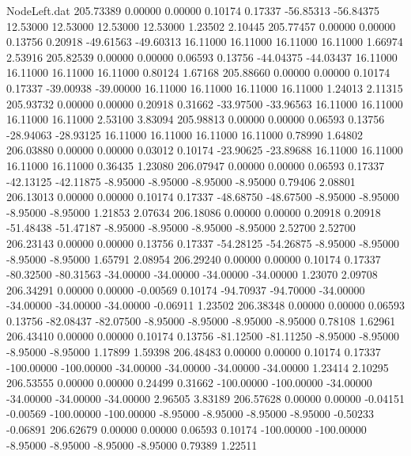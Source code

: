 \begin{filecontents}{NodeLeft.dat}
 205.73389    0.00000    0.00000     0.10174    0.17337  -56.85313  -56.84375   12.53000   12.53000   12.53000   12.53000    1.23502    2.10445
 205.77457    0.00000    0.00000     0.13756    0.20918  -49.61563  -49.60313   16.11000   16.11000   16.11000   16.11000    1.66974    2.53916
 205.82539    0.00000    0.00000     0.06593    0.13756  -44.04375  -44.03437   16.11000   16.11000   16.11000   16.11000    0.80124    1.67168
 205.88660    0.00000    0.00000     0.10174    0.17337  -39.00938  -39.00000   16.11000   16.11000   16.11000   16.11000    1.24013    2.11315
 205.93732    0.00000    0.00000     0.20918    0.31662  -33.97500  -33.96563   16.11000   16.11000   16.11000   16.11000    2.53100    3.83094
 205.98813    0.00000    0.00000     0.06593    0.13756  -28.94063  -28.93125   16.11000   16.11000   16.11000   16.11000    0.78990    1.64802
 206.03880    0.00000    0.00000     0.03012    0.10174  -23.90625  -23.89688   16.11000   16.11000   16.11000   16.11000    0.36435    1.23080
 206.07947    0.00000    0.00000     0.06593    0.17337  -42.13125  -42.11875   -8.95000   -8.95000   -8.95000   -8.95000    0.79406    2.08801
 206.13013    0.00000    0.00000     0.10174    0.17337  -48.68750  -48.67500   -8.95000   -8.95000   -8.95000   -8.95000    1.21853    2.07634
 206.18086    0.00000    0.00000     0.20918    0.20918  -51.48438  -51.47187   -8.95000   -8.95000   -8.95000   -8.95000    2.52700    2.52700
 206.23143    0.00000    0.00000     0.13756    0.17337  -54.28125  -54.26875   -8.95000   -8.95000   -8.95000   -8.95000    1.65791    2.08954
 206.29240    0.00000    0.00000     0.10174    0.17337  -80.32500  -80.31563  -34.00000  -34.00000  -34.00000  -34.00000    1.23070    2.09708
 206.34291    0.00000    0.00000    -0.00569    0.10174  -94.70937  -94.70000  -34.00000  -34.00000  -34.00000  -34.00000   -0.06911    1.23502
 206.38348    0.00000    0.00000     0.06593    0.13756  -82.08437  -82.07500   -8.95000   -8.95000   -8.95000   -8.95000    0.78108    1.62961
 206.43410    0.00000    0.00000     0.10174    0.13756  -81.12500  -81.11250   -8.95000   -8.95000   -8.95000   -8.95000    1.17899    1.59398
 206.48483    0.00000    0.00000     0.10174    0.17337 -100.00000 -100.00000  -34.00000  -34.00000  -34.00000  -34.00000    1.23414    2.10295
 206.53555    0.00000    0.00000     0.24499    0.31662 -100.00000 -100.00000  -34.00000  -34.00000  -34.00000  -34.00000    2.96505    3.83189
 206.57628    0.00000    0.00000    -0.04151   -0.00569 -100.00000 -100.00000   -8.95000   -8.95000   -8.95000   -8.95000   -0.50233   -0.06891
 206.62679    0.00000    0.00000     0.06593    0.10174 -100.00000 -100.00000   -8.95000   -8.95000   -8.95000   -8.95000    0.79389    1.22511

\end{filecontents}
